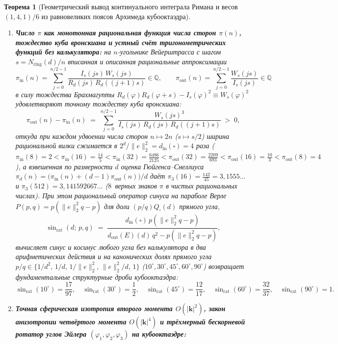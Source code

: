 \documentclass[11pt,a4paper]{article}
\theoremstyle{plain}
\newtheorem{theorem}{Теорема}[section]
\theoremstyle{definition}
\begin{document}
\begin{theorem}[Геометрический вывод континуального интеграла Римана и весов $(1,4,1)/6$ из равновеликих поясов Архимеда кубооктаэдра]
\begin{enumerate}[label=\textbf{(\roman*)},leftmargin=*]
\item \textbf{Число $\pi$ как монотонная рациональная функция числа сторон $\pi(n)$, тождество куба вронскиана и устный счёт тригонометрических функций без калькулятора:}
  на $n$-угольнике Вейерштрасса с шагом $s = N_{\mathrm{ring}}(d)/n$ вписанная и описанная рациональные аппроксимации
  \[
    \pi_{\mathrm{in}}(n) = \sum_{j=0}^{n/2-1}\frac{I_s(js)\,W_s(js)}{R_d(js)\,R_d((j+1)s)}\in\mathbb{Q},\qquad
    \pi_{\mathrm{out}}(n) = \sum_{j=0}^{n/2-1}\frac{W_s(js)}{I_s(js)}\in\mathbb{Q}
  \]
  в силу тождества Брахмагупты $R_d(\varphi)R_d(\varphi+s)-I_s(\varphi)^2 \equiv W_s(\varphi)^2$ удовлетворяют точному \emph{тождеству куба вронскиана}:
  \begin{equation}
    \label{eq:wronskian-cube-pi-gap}
    \pi_{\mathrm{out}}(n) - \pi_{\mathrm{in}}(n) \;=\; \sum_{j=0}^{n/2-1}\frac{W_s(js)^3}{I_s(js)\,R_d(js)\,R_d((j+1)s)} \;>\; 0,
  \end{equation}
  откуда при каждом удвоении числа сторон $n\mapsto 2n$ ($s\mapsto s/2$) ширина рациональной вилки сжимается в $2^d/\|e\|_2^2 = d_{\mathrm{in}}(\square) = 4$ раза ($\pi_{\mathrm{in}}(8)=2 < \pi_{\mathrm{in}}(16)=\frac{14}{5} < \pi_{\mathrm{in}}(32)=\frac{6486}{2125} < \pi_{\mathrm{out}}(32)=\frac{2209}{693} < \pi_{\mathrm{out}}(16)=\frac{10}{3} < \pi_{\mathrm{out}}(8)=4$), а взвешенная по размерности $d$ оценка Гюйгенса--Снеллиуса $\pi_d(n) = \bigl(\pi_{\mathrm{in}}(n)+(d-1)\pi_{\mathrm{out}}(n)\bigr)/d$ даёт $\pi_3(16) = \frac{142}{45} = 3{,}1555\dots$ и $\pi_3(512) = 3{,}141592667\dots$ ($8$~верных знаков $\pi$ в чистых рациональных числах). При этом рациональный оператор синуса на параболе Верле $P(p,q)=p(\|e\|_2^2 q - p)$ для доли $(p/q)Q_\square(d)$ прямого угла,
  \[
    \sin_{\mathrm{rat}}(d;\,p,q) \;=\; \frac{d_{\mathrm{in}}(\square)\,p(\|e\|_2^2 q - p)}{d_{\mathrm{out}}(E)(d)\,q^2 - p(\|e\|_2^2 q - p)},
  \]
  вычисляет синус и косинус любого угла без калькулятора в два арифметических действия и на канонических долях прямого угла $p/q\in\{1/d^2,\,1/d,\,1/\|e\|_2^2,\,\|e\|_2^2/d,\,1\}$ ($10^\circ,30^\circ,45^\circ,60^\circ,90^\circ$) возвращает фундаментальные структурные дроби кубооктаэдра:
  \[
    \sin_{\mathrm{rat}}(10^\circ) = \frac{17}{97},\quad
    \sin_{\mathrm{rat}}(30^\circ) = \frac{1}{2},\quad
    \sin_{\mathrm{rat}}(45^\circ) = \frac{12}{17},\quad
    \sin_{\mathrm{rat}}(60^\circ) = \frac{32}{37},\quad
    \sin_{\mathrm{rat}}(90^\circ) = 1.
  \]
\item \textbf{Точная сферическая изотропия второго момента $O(|\mathbf{k}|^2)$, закон анизотропии четвёртого момента $O(|\mathbf{k}|^4)$ и трёхмерный бескорневой ротатор углов Эйлера $(\varphi_1,\varphi_2,\varphi_3)$ на кубооктаэдре:}

\end{enumerate}
\end{theorem}
\end{document}
